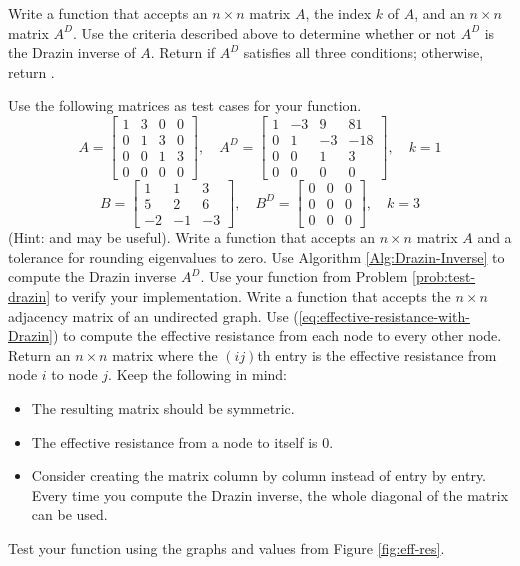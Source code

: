 Write a function that accepts an $n \times n$ matrix $A$, the index $k$ of $A$, and an $n \times n$ matrix $A^D$.
Use the criteria described above to determine whether or not $A^D$ is the Drazin inverse of $A$.
Return  if $A^D$ satisfies all three conditions; otherwise, return .

Use the following matrices as test cases for your function.
\[
A = \left[\begin{array}{cccc}
1 & 3 & 0 & 0 \\
0 & 1 & 3 & 0 \\
0 & 0 & 1 & 3 \\
0 & 0 & 0 & 0
\end{array}\right],
\quad
A^D = \left[\begin{array}{cccc}
1 & -3 & 9 & 81 \\
0 & 1 & -3 & -18 \\
0 & 0 & 1 & 3 \\
0 & 0 & 0 & 0
\end{array}\right],
\quad
k = 1
\]
%
\[
B = \left[\begin{array}{ccc}
 1 &  1 &  3 \\
 5 &  2 &  6 \\
-2 & -1 & -3
\end{array}\right],
\quad B^D = \left[\begin{array}{ccc}
0 & 0 & 0 \\
0 & 0 & 0 \\
0 & 0 & 0
\end{array}\right],
\quad
k = 3
\]
(Hint:  and  may be useful).
\label{prob:test-drazin}
Write a function that accepts an $n \times n$ matrix $A$ and a tolerance for rounding eigenvalues to zero.
Use Algorithm \ref{Alg:Drazin-Inverse} to compute the Drazin inverse $A^D$.
Use your function from Problem \ref{prob:test-drazin} to verify your implementation.
Write a function that accepts the $n \times n$ adjacency matrix of an undirected graph.
Use (\ref{eq:effective-resistance-with-Drazin}) to compute the effective resistance from each node to every other node.
Return an $n \times n$ matrix where the $(ij)$th entry is the effective resistance from node $i$ to node $j$.
Keep the following in mind: %
\begin{itemize}
\item The resulting matrix should be symmetric.
\item The effective resistance from a node to itself is $0$.
\item Consider creating the matrix column by column instead of entry by entry. Every time you compute the Drazin inverse, the whole diagonal of the matrix can be used.
\end{itemize}
Test your function using the graphs and values from Figure \ref{fig:eff-res}.
\label{prob:effective-resistance}

